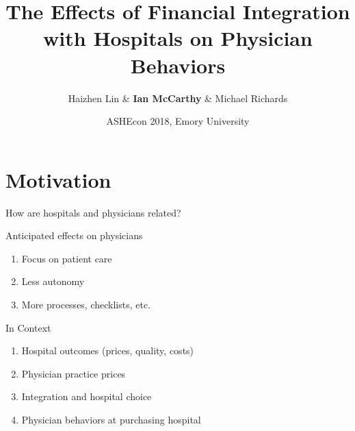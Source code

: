 \documentclass[t]{beamer}
\title{The Effects of Financial Integration with Hospitals on Physician Behaviors}
\date{ASHEcon 2018, Emory University}
\author{Haizhen Lin \& \textbf{Ian McCarthy} \& Michael Richards}
\institute{June 11, 2018}
\begin{document}
\maketitle

\section{Motivation}

\begin{frame}{How are hospitals and physicians related?}
\end{frame}

\begin{frame}{Anticipated effects on physicians}
    \begin{enumerate}
        \item Focus on patient care
        \item Less autonomy
        \item More processes, checklists, etc.
    \end{enumerate}
\end{frame}

\begin{frame}{In Context}
    \begin{enumerate}
        \item<1-> Hospital outcomes (prices, quality, costs)
        \item<1-> Physician practice prices
        \item<1-> Integration and hospital choice
        \item<2-> \alert{Physician behaviors at purchasing hospital}
    \end{enumerate}
\end{frame}
\end{document}
